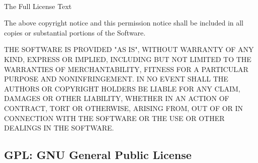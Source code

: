 \begin{frame}{\insertsubsection\ }
\begin{fancycolumns}
\begin{note}{The Full License Text}
{				The above copyright notice and this permission notice shall be included in all copies or substantial portions of the Software.

				THE SOFTWARE IS PROVIDED "AS IS", WITHOUT WARRANTY OF ANY KIND, EXPRESS OR IMPLIED, INCLUDING BUT NOT LIMITED TO THE WARRANTIES OF MERCHANTABILITY, FITNESS FOR A PARTICULAR PURPOSE AND NONINFRINGEMENT. IN NO EVENT SHALL THE AUTHORS OR COPYRIGHT HOLDERS BE LIABLE FOR ANY CLAIM, DAMAGES OR OTHER LIABILITY, WHETHER IN AN ACTION OF CONTRACT, TORT OR OTHERWISE, ARISING FROM, OUT OF OR IN CONNECTION WITH THE SOFTWARE OR THE USE OR OTHER DEALINGS IN THE SOFTWARE.}
		\end{note}
	\end{fancycolumns}
\end{frame}

\subsection{GPL: GNU General Public License}
